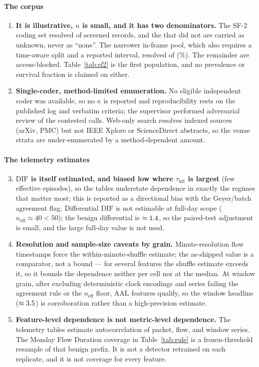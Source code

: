 \documentclass[a4paper,fleqn]{cas-dc}
\newcommand{\DIF}{\mathrm{DIF}}
\newcommand{\neff}{n_{\mathrm{eff}}}
\begin{document}
\paragraph{The corpus}
\begin{enumerate}
\item \textbf{It is illustrative, $n$ is small, and it has two denominators.} The SF-2 coding set
  resolved \NsfTwoRes{} of \NsfTwo{} screened records, and the \NsfTwoUnres{} that did not are
  carried as unknown, never as ``none''. The narrower in-frame pool, which also requires a
  time-aware split and a reported interval, resolved \NinframeRes{} of \Ninframe{} (\ResRate\%).
  The remainder are access-blocked. Table~\ref{tab:sf2} is the first population, and no prevalence
  or survival fraction is claimed on either.
\item \textbf{Single-coder, method-limited enumeration.} No eligible independent coder was
  available, so no $\kappa$ is reported and reproducibility rests on the published log and verbatim
  criteria; the supervisor performed adversarial review of the contested calls. Web-only search
  resolves indexed sources (arXiv, PMC) but not IEEE Xplore or ScienceDirect abstracts, so the
  venue strata are under-enumerated by a method-dependent amount.
\end{enumerate}

\paragraph{The telemetry estimates}
\begin{enumerate}\setcounter{enumi}{2}
\item \textbf{$\DIF$ is itself estimated, and biased low where $\tau_{\mathrm{int}}$ is largest}
  (few effective episodes), so the tables understate dependence in exactly the regimes that matter
  most; this is reported as a directional bias with the Geyer/batch agreement flag. Differential
  $\DIF$ is not estimable at full-day scope ($\neff \approx 40 < 50$); the benign differential is
  $\approx 1.4$, so the paired-test adjustment is small, and the large full-day value is
  not used.
\item \textbf{Resolution and sample-size caveats by grain.} Minute-resolution flow timestamps force
  the within-minute-shuffle estimate; the as-shipped value is a comparator, not a bound --- for
  several features the shuffle estimate exceeds it, so it bounds the dependence neither per cell
  nor at the median. At window grain, after excluding deterministic clock encodings and series
  failing the agreement rule or the $\neff$ floor, \WinQn{} AAL features qualify, so the window
  headline ($\approx3.5$) is corroboration rather than a high-precision estimate.
\item \textbf{Feature-level dependence is not metric-level dependence.} The telemetry tables
  estimate autocorrelation of packet, flow, and window series. The Monday Flow Duration coverage
  in Table~\ref{tab:rule} is a frozen-threshold resample of that benign prefix. It is not a
  detector retrained on each replicate, and it is not coverage for every feature.
\end{enumerate}
\end{document}
